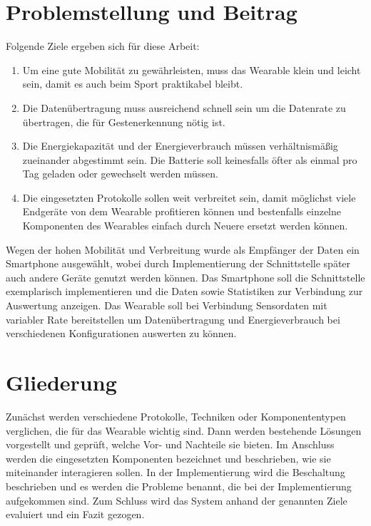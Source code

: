 \section{Problemstellung und Beitrag}
\label{ch:aims}
Folgende Ziele ergeben sich für diese Arbeit:
\begin{enumerate}
	\item Um eine gute Mobilität zu gewährleisten, muss das Wearable klein und leicht sein, damit es auch beim Sport praktikabel bleibt.
	\item Die Datenübertragung muss ausreichend schnell sein um die Datenrate zu übertragen, die für Gestenerkennung nötig ist.
	\item Die Energiekapazität und der Energieverbrauch müssen verhältnismäßig zueinander abgestimmt sein.
	Die Batterie soll keinesfalls öfter als einmal pro Tag geladen oder gewechselt werden müssen.
	\item Die eingesetzten Protokolle sollen weit verbreitet sein, damit möglichst viele Endgeräte von dem Wearable profitieren können und bestenfalls einzelne Komponenten des Wearables einfach durch Neuere ersetzt werden können.
\end{enumerate}
Wegen der hohen Mobilität und Verbreitung wurde als Empfänger der Daten ein Smartphone ausgewählt, wobei durch Implementierung der Schnittstelle später auch andere Geräte genutzt werden können.
Das Smartphone soll die Schnittstelle exemplarisch implementieren und die Daten sowie Statistiken zur Verbindung zur Auswertung anzeigen.
Das Wearable soll bei Verbindung Sensordaten mit variabler Rate bereitstellen um Datenübertragung und Energieverbrauch bei verschiedenen Konfigurationen auswerten zu können.

\section{Gliederung}
Zunächst werden verschiedene Protokolle, Techniken oder Komponententypen verglichen, die für das Wearable wichtig sind.
Dann werden bestehende Lösungen vorgestellt und geprüft, welche Vor- und Nachteile sie bieten.
Im Anschluss werden die eingesetzten Komponenten bezeichnet und beschrieben, wie sie miteinander interagieren sollen.
In der Implementierung wird die Beschaltung beschrieben und es werden die Probleme benannt, die bei der Implementierung aufgekommen sind.
Zum Schluss wird das System anhand der genannten Ziele evaluiert und ein Fazit gezogen.

